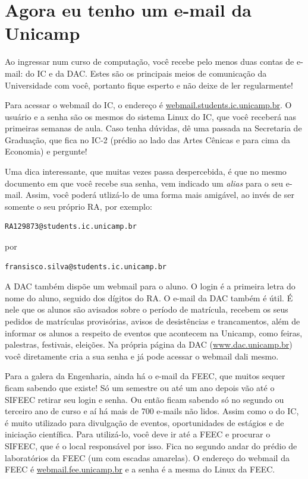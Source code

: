 
\section{Agora eu tenho um e-mail da Unicamp}

Ao ingressar num curso de computação, você recebe pelo menos duas contas de e-mail: do IC e da
DAC. Estes são os principais meios de comunicação da Universidade com você,
portanto fique esperto e não deixe de ler regularmente!

Para acessar o webmail do IC, o endereço é \url{webmail.students.ic.unicamp.br}.
O usuário e a senha são os mesmos do sistema Linux do IC, que você receberá nas
primeiras semanas de aula. Caso tenha dúvidas, dê uma passada na Secretaria de Graduação,
que fica no IC-2 (prédio ao lado das Artes Cênicas e para cima da Economia)
e pergunte!

Uma dica interessante, que muitas vezes passa
despercebida, é que no mesmo documento em que você recebe sua senha, vem indicado
um {\it alias} para o seu e-mail. Assim, você poderá utlizá-lo de
uma forma mais amigável, ao invés de ser somente o seu próprio RA, por 
exemplo:
\begin{verbatim}RA129873@students.ic.unicamp.br \end{verbatim} por 
\begin{verbatim}fransisco.silva@students.ic.unicamp.br \end{verbatim}

A DAC também dispõe um webmail para o aluno. O login é a primeira letra do nome
do aluno, seguido dos dígitos do RA. O e-mail da DAC também é útil. É nele que os
alunos são avisados sobre o período de matrícula, recebem os seus pedidos de
matrículas provisórias, avisos de desistências e trancamentos, além de informar
os alunos a respeito de eventos que acontecem na Unicamp, como feiras,
palestras, festivais, eleições. Na própria página da DAC
(\url{www.dac.unicamp.br}) você diretamente cria a sua senha e já pode
acessar o webmail dali mesmo.

Para a galera da Engenharia, ainda há o e-mail da FEEC, que muitos sequer ficam
sabendo que existe! Só um semestre ou até um ano depois vão até o SIFEEC retirar
seu login e senha. Ou então ficam sabendo só no segundo ou terceiro ano de curso
e aí há mais de 700 e-mails não lidos. Assim como o do IC, é muito
utilizado para divulgação de eventos, oportunidades de estágios e de iniciação
científica. Para utilizá-lo, você deve ir até a FEEC e procurar o SIFEEC, que
é o local responsável por isso. Fica no segundo andar do prédio de laboratórios
da FEEC (um com escadas amarelas). O endereço do webmail da FEEC
é \url{webmail.fee.unicamp.br} e a senha é a mesma do Linux da FEEC.


